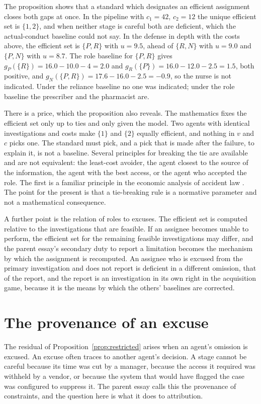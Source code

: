 \documentclass[11pt]{article}
\theoremstyle{plain}
\theoremstyle{definition}
\begin{document}
The proposition shows that a standard which designates an efficient assignment closes both gaps at once. In the pipeline with $c_1=42$, $c_2=12$ the unique efficient set is $\{1,2\}$, and when neither stage is careful both are deficient, which the actual-conduct baseline could not say. In the defense in depth with the costs above, the efficient set is $\{P,R\}$ with $u=9.5$, ahead of $\{R,N\}$ with $u=9.0$ and $\{P,N\}$ with $u=8.7$. The role baseline for $\{P,R\}$ gives $g_P(\{R\})=16.0-10.0-4=2.0$ and $g_R(\{P\})=16.0-12.0-2.5=1.5$, both positive, and $g_N(\{P,R\})=17.6-16.0-2.5=-0.9$, so the nurse is not indicated. Under the reliance baseline no one was indicated; under the role baseline the prescriber and the pharmacist are.

There is a price, which the proposition also reveals. The mathematics fixes the efficient set only up to ties and only given the model. Two agents with identical investigations and costs make $\{1\}$ and $\{2\}$ equally efficient, and nothing in $v$ and $c$ picks one. The standard must pick, and a pick that is made after the failure, to explain it, is not a baseline. Several principles for breaking the tie are available and are not equivalent: the least-cost avoider, the agent closest to the source of the information, the agent with the best access, or the agent who accepted the role. The first is a familiar principle in the economic analysis of accident law \cite{calabresi1970costs}. The point for the present is that a tie-breaking rule is a normative parameter and not a mathematical consequence.

A further point is the relation of roles to excuses. The efficient set is computed relative to the investigations that are feasible. If an assignee becomes unable to perform, the efficient set for the remaining feasible investigations may differ, and the parent essay's secondary duty to report a limitation becomes the mechanism by which the assignment is recomputed. An assignee who is excused from the primary investigation and does not report is deficient in a different omission, that of the report, and the report is an investigation in its own right in the acquisition game, because it is the means by which the others' baselines are corrected.

\section{The provenance of an excuse}\label{sec:gates}

The residual of Proposition~\ref{prop:restricted} arises when an agent's omission is excused. An excuse often traces to another agent's decision. A stage cannot be careful because its time was cut by a manager, because the access it required was withheld by a vendor, or because the system that would have flagged the case was configured to suppress it. The parent essay calls this the provenance of constraints, and the question here is what it does to attribution.
\end{document}
